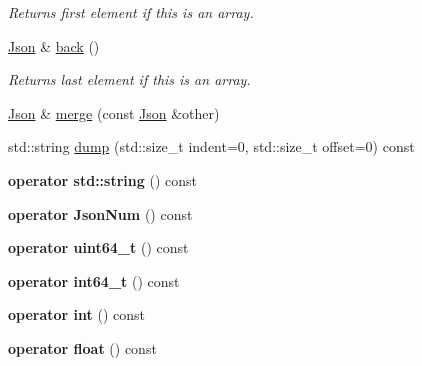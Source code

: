 \begin{DoxyCompactItemize}
\begin{DoxyCompactList}\small\item\em Returns first element if this is an array. \end{DoxyCompactList}\item 
\mbox{\label{classnta_1_1utils_1_1Json_a5ac0dc1f03cedaae9944fb7ff71e3893}} 
\hyperlink{classnta_1_1utils_1_1Json}{Json} \& \hyperlink{classnta_1_1utils_1_1Json_a5ac0dc1f03cedaae9944fb7ff71e3893}{back} ()
\begin{DoxyCompactList}\small\item\em Returns last element if this is an array. \end{DoxyCompactList}\item 
\hyperlink{classnta_1_1utils_1_1Json}{Json} \& \hyperlink{classnta_1_1utils_1_1Json_ac33a8a65bdfaff7c365f99c9ca71eeab}{merge} (const \hyperlink{classnta_1_1utils_1_1Json}{Json} \&other)
\item 
std\+::string \hyperlink{classnta_1_1utils_1_1Json_ab0e60f7a55d12aab005d420c8f924035}{dump} (std\+::size\+\_\+t indent=0, std\+::size\+\_\+t offset=0) const
\item 
\mbox{\label{classnta_1_1utils_1_1Json_a8b160dd0764464cafc047b185fdbc2f1}} 
{\bfseries operator std\+::string} () const
\item 
\mbox{\label{classnta_1_1utils_1_1Json_aa1d29487b097a1485c83c1f153e6b1ef}} 
{\bfseries operator Json\+Num} () const
\item 
\mbox{\label{classnta_1_1utils_1_1Json_a40268cb84b0556e07dd9184a98632f5b}} 
{\bfseries operator uint64\+\_\+t} () const
\item 
\mbox{\label{classnta_1_1utils_1_1Json_a06d392cd9356cacdfd356fcb16161220}} 
{\bfseries operator int64\+\_\+t} () const
\item 
\mbox{\label{classnta_1_1utils_1_1Json_a68ad0d74dc88bb726bbe4245097ec209}} 
{\bfseries operator int} () const
\item 
\mbox{\label{classnta_1_1utils_1_1Json_a7a3b26250aeaa82f9ab0c03a80082a0b}} 
{\bfseries operator float} () const

\end{DoxyCompactItemize}
